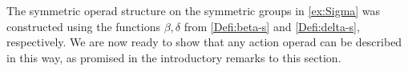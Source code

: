 The symmetric operad structure on the symmetric groups in \cref{ex:Sigma} was constructed using the functions $\beta, \delta$ from \cref{Defi:beta-s} and \cref{Defi:delta-s}, respectively.
We are now ready to show that any action operad can be described in this way, as promised in the introductory remarks to this section.




